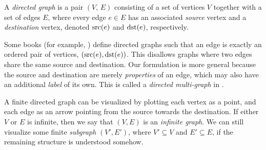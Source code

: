 \documentclass[../generics]{subfiles}
\begin{document}
\begin{definition}
A \emph{directed graph} is a pair $(V,\, E)$ consisting of a set of vertices $V$ together with a set of edges $E$, where every edge $e\in E$ has an associated \emph{source} vertex and a \emph{destination} vertex, denoted $\operatorname{src}(e)$ and $\operatorname{dst}(e)$, respectively.

Some books (for example, \cite{grimaldi}) define directed graphs such that an edge is exactly an ordered pair of vertices, $(\operatorname{src}(e),\operatorname{dst}(e))$. This disallows graphs where two edges share the same source and destination. Our formulation is more general because the source and destination are merely \emph{properties} of an edge, which may also have an additional \emph{label} of its own. This is called a \emph{directed multi-graph} in \cite{alggraph}.

A finite directed graph can be visualized by plotting each vertex as a point, and each edge as an arrow pointing from the source towards the destination. If either $V$ or $E$ is infinite, then we say that $(V, E)$ is an \emph{infinite graph}. We can still visualize some finite \emph{subgraph} $(V', E')$, where $V'\subseteq V$ and $E'\subseteq E$, if the remaining structure is understood somehow.
\end{definition}
\end{document}
